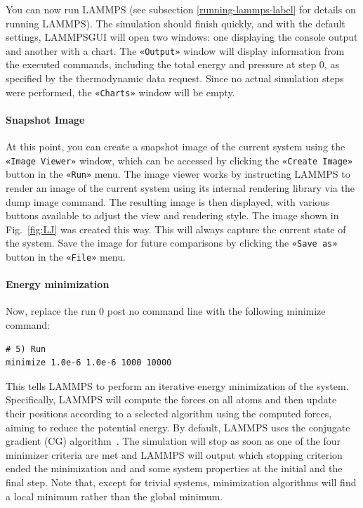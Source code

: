\documentclass[9pt,tutorial]{livecoms}
\newcommand{\lmpcmd}[1]{\colorbox{listing}{\textcolor{command}{\small{#1}}}} %
\newcommand{\guicmd}[1]{\textcolor{command}{\texttt{«#1»}}} %
\newcommand{\lammpsgui}{\textsf{LAMMPS\textendash GUI}}
\begin{document}
You can now run LAMMPS {\color{blue}(see subsection \ref{running-lammps-label}
for details on running LAMMPS)}.  The simulation should finish quickly, and with the default
settings, \lammpsgui{} will open two windows: one displaying the console
output and another with a chart.  The \guicmd{Output} window will display information from
the executed commands, including the total energy and pressure at step 0,
as specified by the thermodynamic data request.  Since no actual simulation
steps were performed, the \guicmd{Charts} window will be empty.

\paragraph{Snapshot Image}

At this point, you can create a snapshot image of the current system
using the \guicmd{Image Viewer} window, which can be accessed by
clicking the \guicmd{Create Image} button in the \guicmd{Run} menu.  The
image viewer works by instructing LAMMPS to render an image of the
current system using its internal rendering library via the \lmpcmd{dump
  image} command.  The resulting image is then displayed, with various
buttons available to adjust the view and rendering style.  The image
shown in Fig.~\ref{fig:LJ} was created this way.  This will always
capture the current state of the system.  Save the image for future
comparisons {\color{blue}by clicking the \guicmd{Save as} button
in the \guicmd{File} menu}.

\paragraph{Energy minimization}

Now, replace the \lmpcmd{run 0 post no} command line with the
following \lmpcmd{minimize} command:
\begin{lstlisting}
# 5) Run
minimize 1.0e-6 1.0e-6 1000 10000
\end{lstlisting}
This tells LAMMPS to perform an {\color{blue} iterative} energy
minimization of the system.  Specifically, LAMMPS will compute the
forces on all atoms and then update their positions according to a
selected algorithm using the computed forces, aiming to reduce the
potential energy.  By default, LAMMPS uses the conjugate gradient (CG)
algorithm~\cite{hestenes1952methods}.  The simulation will stop as soon
as {\color{blue}one of the four minimizer criteria are met and LAMMPS
  will output which stopping criterion ended the minimization and
  and some system properties at the initial and the final step.}
Note that, except for trivial systems, minimization algorithms will find a
local minimum rather than the global minimum.
\end{document}
